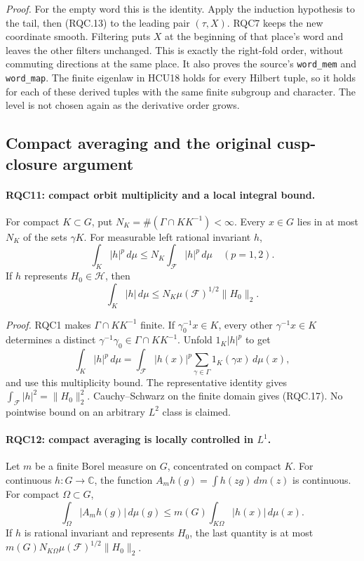 \emph{Proof.}
For the empty word this is the identity.  Apply the induction
hypothesis to the tail, then (RQC.13) to the leading pair
\((\tau,X)\).  RQC7 keeps the new coordinate smooth.
Filtering puts \(X\) at the beginning of that place's word and
leaves the other filters unchanged.  This is exactly the
right-fold order, without commuting directions at the same place.
It also proves the source's \texttt{word\_mem} and
\texttt{word\_map}.  The finite eigenlaw in HCU18 holds for every
Hilbert tuple, so it holds for each of these derived tuples with
the same finite subgroup and character.  The level is not chosen
again as the derivative order grows.

\subsection{Compact averaging and the original cusp-closure argument}

\paragraph{RQC11: compact orbit multiplicity and a local integral bound.}
\label{claim:RQC11}
For compact \(K\subset G\), put
\(N_K=\#(\Gamma\cap KK^{-1})<\infty\).
Every \(x\in G\) lies in at most \(N_K\) of the sets \(\gamma K\).
For measurable left rational invariant \(h\),
\[
 \int_K|h|^p\,d\mu\le N_K\int_{\mathcal F}|h|^p\,d\mu
 \quad(p=1,2).
 \tag{RQC.16}
\]
If \(h\) represents \(H_0\in\mathcal H\), then
\[
 \int_K|h|\,d\mu
 \le N_K\mu(\mathcal F)^{1/2}\|H_0\|_2.
 \tag{RQC.17}
\]

\emph{Proof.}
RQC1 makes \(\Gamma\cap KK^{-1}\) finite.
If \(\gamma_0^{-1}x\in K\), every other
\(\gamma^{-1}x\in K\) determines a distinct
\(\gamma^{-1}\gamma_0\in\Gamma\cap KK^{-1}\).
Unfold \(1_K|h|^p\) to get
\[
 \int_K|h|^p\,d\mu
 =\int_{\mathcal F}|h(x)|^p
       \sum_{\gamma\in\Gamma}1_K(\gamma x)\,d\mu(x),
\]
and use this multiplicity bound.  The representative identity
gives \(\int_{\mathcal F}|h|^2=\|H_0\|_2^2\).
Cauchy--Schwarz on the finite domain gives (RQC.17).
No pointwise bound on an arbitrary \(L^2\) class is claimed.

\paragraph{RQC12: compact averaging is locally controlled in \(L^1\).}
\label{claim:RQC12}
Let \(m\) be a finite Borel measure on \(G\), concentrated on
compact \(K\).  For continuous \(h:G\to\mathbb C\), the function
\(A_mh(g)=\int h(zg)\,dm(z)\) is continuous.  For compact
\(\Omega\subset G\),
\[
 \int_\Omega|A_mh(g)|\,d\mu(g)
 \le m(G)\int_{K\Omega}|h(x)|\,d\mu(x).
 \tag{RQC.18}
\]
If \(h\) is rational invariant and represents \(H_0\), the last
quantity is at most
\(m(G)N_{K\Omega}\mu(\mathcal F)^{1/2}\|H_0\|_2\).

